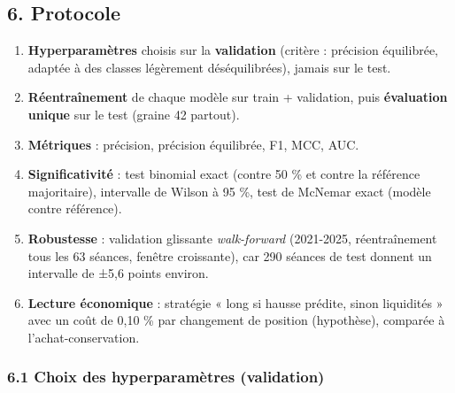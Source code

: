 \documentclass[
  10pt,
]{article}
\providecommand{\tightlist}{%
  \setlength{\itemsep}{0pt}\setlength{\parskip}{0pt}}
\begin{document}
\hypertarget{protocole}{%
\subsection{6. Protocole}\label{protocole}}

\begin{enumerate}
\def\labelenumi{\arabic{enumi}.}
\tightlist
\item
  \textbf{Hyperparamètres} choisis sur la \textbf{validation} (critère :
  précision équilibrée, adaptée à des classes légèrement
  déséquilibrées), jamais sur le test.
\item
  \textbf{Réentraînement} de chaque modèle sur train + validation, puis
  \textbf{évaluation unique} sur le test (graine 42 partout).
\item
  \textbf{Métriques} : précision, précision équilibrée, F1, MCC, AUC.
\item
  \textbf{Significativité} : test binomial exact (contre 50 \% et contre
  la référence majoritaire), intervalle de Wilson à 95 \%, test de
  McNemar exact (modèle contre référence).
\item
  \textbf{Robustesse} : validation glissante \emph{walk-forward}
  (2021-2025, réentraînement tous les 63 séances, fenêtre croissante),
  car 290 séances de test donnent un intervalle de ±5,6 points environ.
\item
  \textbf{Lecture économique} : stratégie « long si hausse prédite,
  sinon liquidités » avec un coût de 0,10 \% par changement de position
  (hypothèse), comparée à l'achat-conservation.
\end{enumerate}

\hypertarget{choix-des-hyperparamuxe8tres-validation}{%
\subsubsection{6.1 Choix des hyperparamètres
(validation)}\label{choix-des-hyperparamuxe8tres-validation}}
\end{document}
